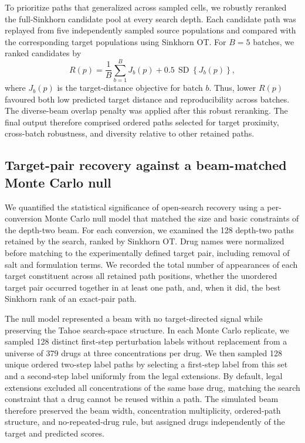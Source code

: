 \documentclass[11pt,a4paper]{article}
\begin{document}
To prioritize paths that generalized across sampled cells, we robustly reranked the full-Sinkhorn candidate pool at every search depth. Each candidate path was replayed from five independently sampled source populations and compared with the corresponding target populations using Sinkhorn OT. For $B=5$ batches, we ranked candidates by
\begin{equation}
R(p)=\frac{1}{B}\sum_{b=1}^{B}J_b(p)+0.5\,\operatorname{SD}\!\left\{J_b(p)\right\},
\end{equation}
where $J_b(p)$ is the target-distance objective for batch $b$. Thus, lower $R(p)$ favoured both low predicted target distance and reproducibility across batches. The diverse-beam overlap penalty was applied after this robust reranking. The final output therefore comprised ordered paths selected for target proximity, cross-batch robustness, and diversity relative to other retained paths.

\subsection{Target-pair recovery against a beam-matched Monte Carlo null}
We quantified the statistical significance of open-search recovery using a per-conversion Monte Carlo null model that matched the size and basic constraints of the depth-two beam. For each conversion, we examined the 128 depth-two paths retained by the search, ranked by Sinkhorn OT. Drug names were normalized before matching to the experimentally defined target pair, including removal of salt and formulation terms. We recorded the total number of appearances of each target constituent across all retained path positions, whether the unordered target pair occurred together in at least one path, and, when it did, the best Sinkhorn rank of an exact-pair path.

The null model represented a beam with no target-directed signal while preserving the Tahoe search-space structure. In each Monte Carlo replicate, we sampled 128 distinct first-step perturbation labels without replacement from a universe of 379 drugs at three concentrations per drug. We then sampled 128 unique ordered two-step label paths by selecting a first-step label from this set and a second-step label uniformly from the legal extensions. By default, legal extensions excluded all concentrations of the same base drug, matching the search constraint that a drug cannot be reused within a path. The simulated beam therefore preserved the beam width, concentration multiplicity, ordered-path structure, and no-repeated-drug rule, but assigned drugs independently of the target and predicted scores.
\end{document}
